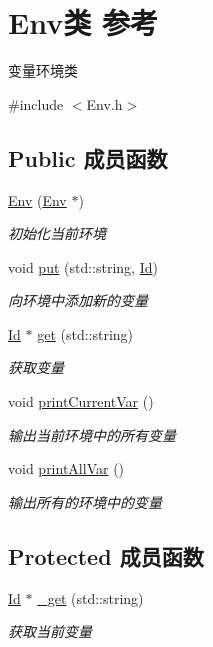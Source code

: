 \hypertarget{class_env}{}\section{Env类 参考}
\label{class_env}


变量环境类  




{\ttfamily \#include $<$Env.\+h$>$}

\subsection*{Public 成员函数}
\begin{DoxyCompactItemize}
\item 
\hyperlink{class_env_ab9d20c5b47453e30038f156cc5e25c0f}{Env} (\hyperlink{class_env}{Env} $\ast$)
\begin{DoxyCompactList}\small\item\em 初始化当前环境 \end{DoxyCompactList}\item 
\mbox{\label{class_env_a4648c2b83fea7e757ccb4ab519ffc9a0}} 
void \hyperlink{class_env_a4648c2b83fea7e757ccb4ab519ffc9a0}{put} (std\+::string, \hyperlink{class_id}{Id})
\begin{DoxyCompactList}\small\item\em 向环境中添加新的变量 \end{DoxyCompactList}\item 
\hyperlink{class_id}{Id} $\ast$ \hyperlink{class_env_a59bbdcdb7af396f6fb6cbff2f828e62b}{get} (std\+::string)
\begin{DoxyCompactList}\small\item\em 获取变量 \end{DoxyCompactList}\item 
void \hyperlink{class_env_a398c166330482abb7e38c546bc3974cf}{print\+Current\+Var} ()
\begin{DoxyCompactList}\small\item\em 输出当前环境中的所有变量 \end{DoxyCompactList}\item 
void \hyperlink{class_env_a8ba6704ef2039c2329569efc99f1e087}{print\+All\+Var} ()
\begin{DoxyCompactList}\small\item\em 输出所有的环境中的变量 \end{DoxyCompactList}\end{DoxyCompactItemize}
\subsection*{Protected 成员函数}
\begin{DoxyCompactItemize}
\item 
\hyperlink{class_id}{Id} $\ast$ \hyperlink{class_env_aca71253ff9d30153d0834a47cd35a351}{\+\_\+get} (std\+::string)
\begin{DoxyCompactList}\small\item\em 获取当前变量 \end{DoxyCompactList}\end{DoxyCompactItemize}

